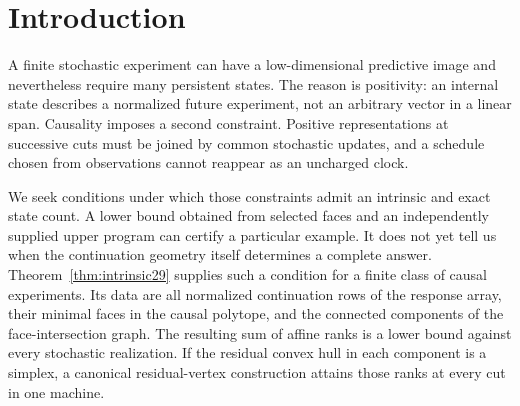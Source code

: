 \begin{abstract}
We study the number of persistent states needed to realize a causal
statistical response. For a complete finite response array we define an
intrinsic support-component rank from all normalized continuations.
Every stochastic realization obeys this cutwise lower bound. If the
convex hull in each component is a simplex, residual vertices attain
all these bounds simultaneously through normalized causal updates.
The criterion is finite and effective on rational data, and the complete
class is closed under independent products of terminal channels, with
multiplicative state counts. A growing binary random-access experiment
then separates predictive dimension from positive memory: its exact
minimum whole-schedule peak is $n+1$ for $0<\eta\le n^{-2}$ and $2^n$
for $1-n^{-1}<\eta\le1$, even when acquisition order is chosen
adaptively. The weak-signal bound is attained by an explicit sequence
of compatible enclosing simplices, not merely by a final encoder.
Minimax contact connects the classification to the marked physical
audit and its exact five-state decision law. The previously established
positive-noise saddle, fixed-clock validation-order classification,
support-boundary jump, causal foundations and transport proofs are
retained as supporting mathematics. Exact physical counts assume a
specified target and atomic stochastic rows; acquired calibration has
separately priced approximation guarantees.
\end{abstract}
\maketitle
\tableofcontents
\clearpage

\section{Introduction}
A finite stochastic experiment can have a low-dimensional predictive
image and nevertheless require many persistent states. The reason is
positivity: an internal state describes a normalized future experiment,
not an arbitrary vector in a linear span. Causality imposes a second
constraint. Positive representations at successive cuts must be joined
by common stochastic updates, and a schedule chosen from observations
cannot reappear as an uncharged clock.

We seek conditions under which those constraints admit an intrinsic
and exact state count. A lower bound obtained from selected faces and
an independently supplied upper program can certify a particular
example. It does not yet tell us when the continuation geometry itself
determines a complete answer. Theorem~\ref{thm:intrinsic29} supplies
such a condition for a finite class of causal experiments. Its data are
all normalized continuation rows of the response array, their minimal
faces in the causal polytope, and the connected components of the
face-intersection graph. The resulting sum of affine ranks is a lower
bound against every stochastic realization. If the residual convex
hull in each component is a simplex, a canonical residual-vertex
construction attains those ranks at every cut in one machine.

